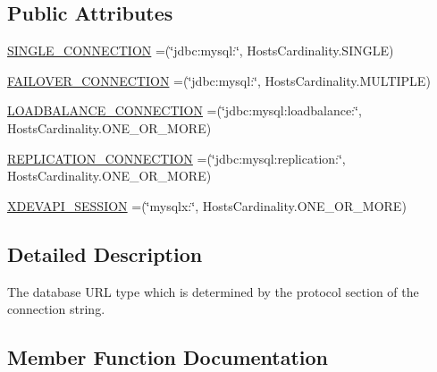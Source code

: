 \subsection*{Public Attributes}
\begin{DoxyCompactItemize}
\item 
\mbox{\hyperlink{enumcom_1_1mysql_1_1cj_1_1conf_1_1_connection_url_1_1_type_a48648ec33433ce9dfa4a67f27acaa0b3}{S\+I\+N\+G\+L\+E\+\_\+\+C\+O\+N\+N\+E\+C\+T\+I\+ON}} =(\char`\"{}jdbc\+:mysql\+:\char`\"{}, Hosts\+Cardinality.\+S\+I\+N\+G\+LE)
\item 
\mbox{\hyperlink{enumcom_1_1mysql_1_1cj_1_1conf_1_1_connection_url_1_1_type_aa2a215d8ff6199735c6e2543a16dd3ee}{F\+A\+I\+L\+O\+V\+E\+R\+\_\+\+C\+O\+N\+N\+E\+C\+T\+I\+ON}} =(\char`\"{}jdbc\+:mysql\+:\char`\"{}, Hosts\+Cardinality.\+M\+U\+L\+T\+I\+P\+LE)
\item 
\mbox{\hyperlink{enumcom_1_1mysql_1_1cj_1_1conf_1_1_connection_url_1_1_type_a3eee8edf85b7e8dc203d2edc97006252}{L\+O\+A\+D\+B\+A\+L\+A\+N\+C\+E\+\_\+\+C\+O\+N\+N\+E\+C\+T\+I\+ON}} =(\char`\"{}jdbc\+:mysql\+:loadbalance\+:\char`\"{}, Hosts\+Cardinality.\+O\+N\+E\+\_\+\+O\+R\+\_\+\+M\+O\+RE)
\item 
\mbox{\hyperlink{enumcom_1_1mysql_1_1cj_1_1conf_1_1_connection_url_1_1_type_a4c2301896aad3ca53cbc7d88d34630b9}{R\+E\+P\+L\+I\+C\+A\+T\+I\+O\+N\+\_\+\+C\+O\+N\+N\+E\+C\+T\+I\+ON}} =(\char`\"{}jdbc\+:mysql\+:replication\+:\char`\"{}, Hosts\+Cardinality.\+O\+N\+E\+\_\+\+O\+R\+\_\+\+M\+O\+RE)
\item 
\mbox{\hyperlink{enumcom_1_1mysql_1_1cj_1_1conf_1_1_connection_url_1_1_type_ac40e1e74b0d797302f6c1caf03b015e1}{X\+D\+E\+V\+A\+P\+I\+\_\+\+S\+E\+S\+S\+I\+ON}} =(\char`\"{}mysqlx\+:\char`\"{}, Hosts\+Cardinality.\+O\+N\+E\+\_\+\+O\+R\+\_\+\+M\+O\+RE)
\end{DoxyCompactItemize}


\subsection{Detailed Description}
The database U\+RL type which is determined by the protocol section of the connection string. 

\subsection{Member Function Documentation}
\mbox{\label{enumcom_1_1mysql_1_1cj_1_1conf_1_1_connection_url_1_1_type_afad2e4b4bcf59858a3b9b1a673c9a837}} 
